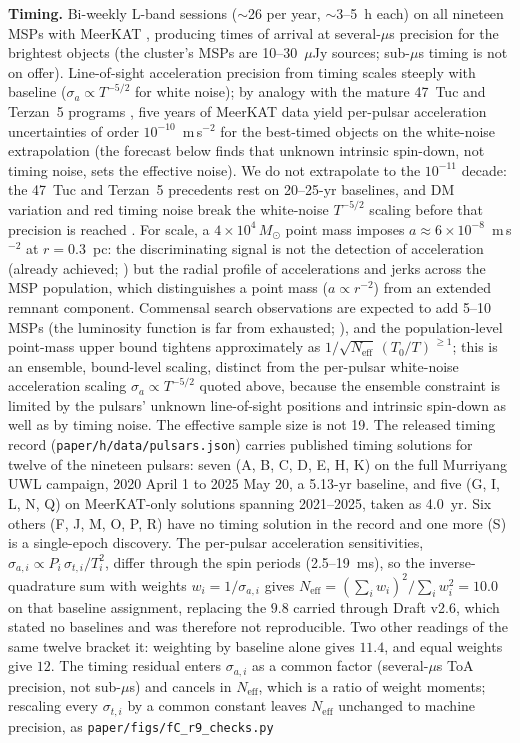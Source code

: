 \documentclass[11pt]{article}
\newcommand{\msun}{\ensuremath{M_\odot}}
\begin{document}
\textbf{Timing.} Bi-weekly L-band sessions ($\sim$26 per year, $\sim$3--5~h each) on all nineteen MSPs with MeerKAT \citep{Jonas2016}, producing times of arrival at several-$\mu$s precision for the brightest objects (the cluster's MSPs are 10--30~$\mu$Jy sources; sub-$\mu$s timing is not on offer). Line-of-sight acceleration precision from timing scales steeply with baseline ($\sigma_{a}\propto T^{-5/2}$ for white noise); by analogy with the mature 47~Tuc and Terzan~5 programs \citep{Freire2017,Prager2017}, five years of MeerKAT data yield per-pulsar acceleration uncertainties of order $10^{-10}$~m\,s$^{-2}$ for the best-timed objects on the white-noise extrapolation (the forecast below finds that unknown intrinsic spin-down, not timing noise, sets the effective noise). We do not extrapolate to the $10^{-11}$ decade: the 47~Tuc and Terzan~5 precedents rest on 20--25-yr baselines, and DM variation and red timing noise break the white-noise $T^{-5/2}$ scaling before that precision is reached \citep{VanHaasteren2013}. For scale, a $4\times10^{4}\,\msun$ point mass imposes $a \approx 6\times10^{-8}$~m\,s$^{-2}$ at $r=0.3$~pc: the discriminating signal is not the detection of acceleration (already achieved; \citealt{Dai2023,BanaresHernandez2025}) but the radial profile of accelerations and jerks across the MSP population, which distinguishes a point mass ($a \propto r^{-2}$) from an extended remnant component. Commensal search observations are expected to add 5--10 MSPs (the luminosity function is far from exhausted; \citealt{Chen2023}), and the population-level point-mass upper bound tightens approximately as $1/\sqrt{N_{\mathrm{eff}}}\,(T_0/T)^{\,\geq 1}$; this is an ensemble, bound-level scaling, distinct from the per-pulsar white-noise acceleration scaling $\sigma_{a}\propto T^{-5/2}$ quoted above, because the ensemble constraint is limited by the pulsars' unknown line-of-sight positions and intrinsic spin-down as well as by timing noise. The effective sample size is not 19. The released timing record (\texttt{paper/h/data/pulsars.json}) carries published timing solutions for twelve of the nineteen pulsars: seven (A, B, C, D, E, H, K) on the full Murriyang UWL campaign, 2020 April 1 to 2025 May 20, a 5.13-yr baseline, and five (G, I, L, N, Q) on MeerKAT-only solutions spanning 2021--2025, taken as 4.0~yr. Six others (F, J, M, O, P, R) have no timing solution in the record and one more (S) is a single-epoch discovery. The per-pulsar acceleration sensitivities, $\sigma_{a,i} \propto P_{i}\,\sigma_{t,i}/T_{i}^{2}$, differ through the spin periods (2.5--19~ms), so the inverse-quadrature sum with weights $w_{i} = 1/\sigma_{a,i}$ gives $N_{\mathrm{eff}} = (\sum_{i} w_{i})^{2}/\sum_{i} w_{i}^{2} = 10.0$ on that baseline assignment, replacing the $9.8$ carried through Draft v2.6, which stated no baselines and was therefore not reproducible. Two other readings of the same twelve bracket it: weighting by baseline alone gives $11.4$, and equal weights give $12$. The timing residual enters $\sigma_{a,i}$ as a common factor (several-$\mu$s ToA precision, not sub-$\mu$s) and cancels in $N_{\mathrm{eff}}$, which is a ratio of weight moments; rescaling every $\sigma_{t,i}$ by a common constant leaves $N_{\mathrm{eff}}$ unchanged to machine precision, as \texttt{paper/figs/fC\_r9\_checks.py} 
\end{document}
